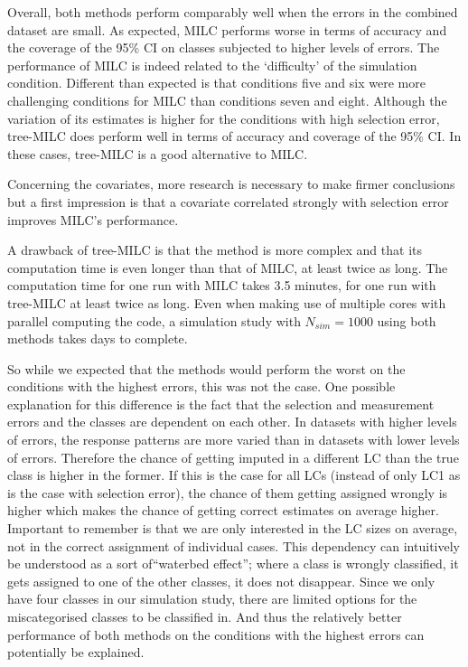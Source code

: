 \documentclass[a4paper, 11pt]{article} %
\begin{document}
Overall, both methods perform comparably well when the errors in the combined dataset are small. As expected, MILC performs worse in terms of accuracy and the coverage of the 95\% CI on classes subjected to higher levels of errors. The performance of MILC is indeed related to the `difficulty' of the simulation condition. Different than expected is that conditions five and six were more challenging conditions for MILC than conditions seven and eight. Although the variation of its estimates is higher for the conditions with high selection error, tree-MILC does perform well in terms of accuracy and coverage of the 95\% CI. In these cases, tree-MILC is a good alternative to MILC. 

Concerning the covariates, more research is necessary to make firmer conclusions but a first impression is that a covariate correlated strongly with selection error improves MILC's performance.

A drawback of tree-MILC is that the method is more complex and that its computation time is even longer than that of MILC, at least twice as long. The computation time for one run with MILC takes 3.5 minutes, for one run with tree-MILC at least twice as long. Even when making use of multiple cores with parallel computing the code, a simulation study with $N_{sim} = 1000$ using both methods takes days to complete.

So while we expected that the methods would perform the worst on the conditions with the highest errors, this was not the case. One possible explanation for this difference is the fact that the selection and measurement errors and the classes are dependent on each other. In datasets with higher levels of errors, the response patterns are more varied than in datasets with lower levels of errors. Therefore the chance of getting imputed in a different LC than the true class is higher in the former. If this is the case for all LCs (instead of only LC1 as is the case with selection error), the chance of them getting assigned wrongly is higher which makes the chance of getting correct estimates on average higher. Important to remember is that we are only interested in the LC sizes on average, not in the correct assignment of individual cases. This dependency can intuitively be understood as a sort of``waterbed effect''; where a class is wrongly classified, it gets assigned to one of the other classes, it does not disappear. Since we only have four classes in our simulation study, there are limited options for the miscategorised classes to be classified in. And thus the relatively better performance of both methods on the conditions with the highest errors can potentially be explained. 
\end{document}
